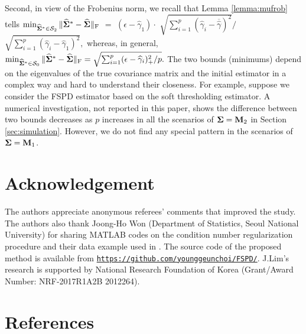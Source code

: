\documentclass[times,sort&compress,3p]{elsarticle}
\newcommand{\MC}{\mathcal}
\begin{document}
 Second, in view of the Frobenius norm, we recall that  Lemma \ref{lemma:mufrob} tells
 $
 \min_{\widehat{\bf \Sigma}^* \in \MC{S}_2} \| \widehat{\bf \Sigma}^* - \widehat{\bf \Sigma} \|_{\rm F}$  
 $=$ 
 $(\epsilon - \widehat{\gamma}_{1}) \cdot$
 $\sqrt{ \sum_{i=1}^p ({\widehat{\gamma}}_i - {\overline{\widehat{\gamma}}})^2} /$  
 $\sqrt{\sum_{i=1}^p ({\widehat{\gamma}}_i - {\widehat{\gamma}}_1)^2 },
 $
 whereas, in general,
 $
 \min_{\widehat{\bf \Sigma}^* \in \MC{S}_0} \| \widehat{\bf \Sigma}^* - \widehat{\bf \Sigma} \|_{\rm F}
 = \sqrt{ \sum_{i=1}^{p} (\epsilon - \widehat{\gamma}_i)_+^2 / p }.
 $ 
The two bounds (minimums) depend on the eigenvalues of the true covariance matrix 
and the initial estimator in a complex way and hard to understand their closeness. For example, 
suppose we consider the FSPD estimator based on the soft thresholding estimator. 
A numerical investigation, not reported in this paper, shows the difference between two 
bounds decreases as $p$ increases in all the scenarios of ${\bf \Sigma}={\bf M}_2$ 
in Section \ref{sec:simulation}. However, we do not find any special pattern in the scenarios
of ${\bf \Sigma}={\bf M}_1$. 


\section*{Acknowledgement}

The authors appreciate anonymous referees' comments that improved the study.
The authors also thank Joong-Ho Won (Department of Statistics, Seoul National University) 
for sharing \textsf{MATLAB} codes on the condition number regularization procedure and their data example 
used in \cite{Won2013}. The source code of the proposed method is available from \texttt{\url{https://github.com/younggeunchoi/FSPD/}}.
J.Lim's research is supported by National Research Foundation of Korea (Grant/Award Number: NRF-2017R1A2B 2012264).
\bigskip




\section*{References}

%
\end{document}
